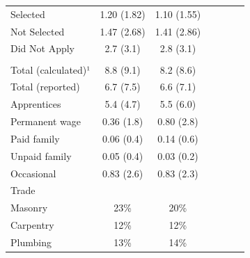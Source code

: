 \documentclass[
  11pt,
a4paper
]{report}
\begin{document}
\begin{table}[H]
\begin{threeparttable}
{\begin{tabular}[t]{lcccccc}
\hspace{1em}\hspace{1em}Selected & 1.20 (1.82) & 1.10 (1.55) &  &  &  & \\
\hspace{1em}\hspace{1em}Not Selected & 1.47 (2.68) & 1.41 (2.86) &  &  &  & \\
\hspace{1em}\hspace{1em}Did Not Apply & 2.7 (3.1) & 2.8 (3.1) &  &  &  & \\
\addlinespace[0.3em]
\multicolumn{7}{l}{\hspace{1em}Firm size}\\
\hspace{1em}\hspace{1em}Total (calculated)¹ & 8.8 (9.1) & 8.2 (8.6) &  &  &  & \\
\hspace{1em}\hspace{1em}Total (reported) & 6.7 (7.5) & 6.6 (7.1) &  &  &  & \\
\hspace{1em}\hspace{1em}Apprentices & 5.4 (4.7) & 5.5 (6.0) &  &  &  & \\
\hspace{1em}\hspace{1em}Permanent wage & 0.36 (1.8) & 0.80 (2.8) &  &  &  & \\
\hspace{1em}\hspace{1em}Paid family & 0.06 (0.4) & 0.14 (0.6) &  &  &  & \\
\hspace{1em}\hspace{1em}Unpaid family & 0.05 (0.4) & 0.03 (0.2) &  &  &  & \\
\hspace{1em}\hspace{1em}Occasional & 0.83 (2.6) & 0.83 (2.3) &  &  &  & \\
\hspace{1em}Trade &  &  &  &  &  & \\
\hspace{1em}\hspace{1em}Masonry & 23\% & 20\% &  &  &  & \\
\hspace{1em}\hspace{1em}Carpentry & 12\% & 12\% &  &  &  & \\
\hspace{1em}\hspace{1em}Plumbing & 13\% & 14\% &  &  &  & \\

\end{tabular}}
\end{threeparttable}
\end{table}
\end{document}
